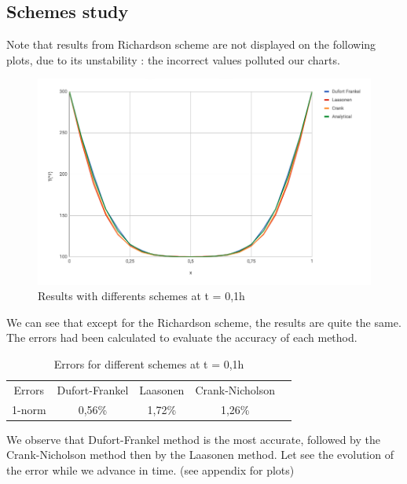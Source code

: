 \documentclass{article}
\begin{document}
        \subsection{Schemes study}
            Note that results from Richardson scheme are not displayed on the following plots, due to its unstability \cite{rich}: 
        the incorrect values polluted our charts.
        \begin{figure}[H]
            \includegraphics[width=\textwidth]{t01.png}
            \caption{Results with differents schemes at t = 0,1h}
        \end{figure}
        We can see that except for the Richardson scheme, the results are quite the same. The errors had been calculated 
        to evaluate the accuracy of each method.
        \begin{table}[H]
            \centering
            \caption{Errors for different schemes at t = 0,1h}
            \begin{tabular}{|c|c|c|c|l}
            \cline{1-4}
            Errors & Dufort-Frankel & Laasonen & Crank-Nicholson &  \\ \cline{1-4}
            1-norm & 0,56\%         & 1,72\%   & 1,26\%          &  \\ \cline{1-4}
            \end{tabular}
        \end{table}
        We observe that Dufort-Frankel method is the most accurate, 
        followed by the Crank-Nicholson method then by the Laasonen method. Let see the evolution of the error
        while we advance in time. (see appendix for plots)
        
\end{document}
